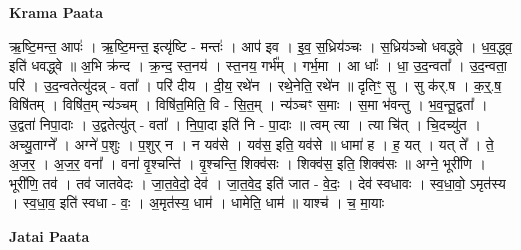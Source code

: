 \documentclass[17pt]{extarticle}
\begin{document}
\textbf{Krama Paata} \newline

ऋ॒ष्टि॒मन्त॒ आपः॑ । ऋ॒ष्टि॒मन्त॒ इत्यृ॑ष्टि - मन्तः॑ । आप॑ इव । इ॒व॒ स॒ध्रिय॑ञ्चः । स॒ध्रिय॑ञ्चो धवद्ध्वे । ध॒व॒द्ध्व॒ इति॑ धवद्ध्वे ॥ अ॒भि क्र॑न्द । क्र॒न्द॒ स्त॒नय॑ । स्त॒नय॒ गर्भ᳚म् । गर्भ॒मा । आ धाः᳚ । धा॒ उ॒द॒न्वता᳚ । उ॒द॒न्वता॒ परि॑ । उ॒द॒न्वतेत्यु॑दन्न् - वता᳚ । परि॑ दीय । दी॒य॒ रथे॑न । रथे॒नेति॒ रथे॑न ॥ दृतिꣳ॒॒ सु । सु क॑र्.ष । क॒र्॒.ष॒ विषि॑तम् । विषि॑त॒म् न्य॑ञ्चम् । विषि॑त॒मिति॒ वि - सि॒त॒म् । न्य॑ञ्चꣳ स॒माः । स॒मा भ॑वन्तु । भ॒व॒न्तू॒द्वता᳚ । उ॒द्वता॑ निपा॒दाः । उ॒द्वतेत्यु॑त् - वता᳚ । नि॒पा॒दा इति॑ नि - पा॒दाः ॥ त्वम् त्या । त्या चि॑त् । चि॒दच्यु॑त । अच्यु॒ताग्ने᳚ । अग्ने॑ प॒शुः । प॒शुर् न । न यव॑से । यव॑स॒ इति॒ यव॑से ॥ धामा॑ ह । ह॒ यत् । यत् ते᳚ । ते॒ अ॒ज॒र॒ । अ॒ज॒र॒ वना᳚ । वना॑ वृ॒श्चन्ति॑ । वृ॒श्चन्ति॒ शिक्व॑सः । शिक्व॑स॒ इति॒ शिक्व॑सः ॥ अग्ने॒ भूरी॑णि । भूरी॑णि॒ तव॑ । तव॑ जातवेदः । जा॒त॒वे॒दो॒ देव॑ । जा॒त॒वे॒द॒ इति॑ जात - वे॒दः॒ । देव॑ स्वधावः । स्व॒धा॒वो॒ ऽमृत॑स्य । स्व॒धा॒व॒ इति॑ स्वधा - वः॒ । अ॒मृत॑स्य॒ धाम॑ । धामेति॒ धाम॑ ॥ याश्च॑ । च॒ मा॒याः \newline

\textbf{Jatai Paata} \newline
\end{document}
